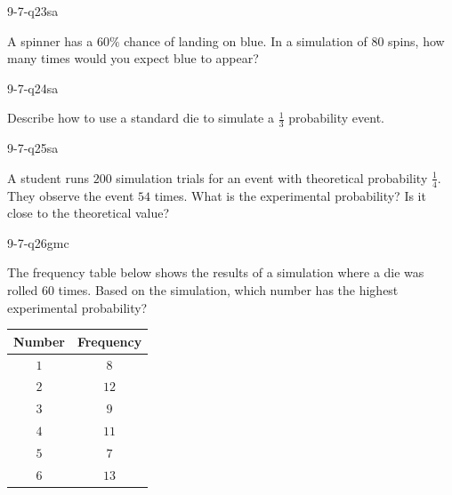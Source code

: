 \begin{practiceQuestion}{9-7-q23}{sa}
\begin{questionText}
A spinner has a $60\%$ chance of landing on blue. In a simulation of $80$ spins, how many times would you expect blue to appear?
\end{questionText}
\end{practiceQuestion}

\begin{practiceQuestion}{9-7-q24}{sa}
\begin{questionText}
Describe how to use a standard die to simulate a $\frac{1}{3}$ probability event.
\end{questionText}
\end{practiceQuestion}

\begin{practiceQuestion}{9-7-q25}{sa}
\begin{questionText}
A student runs $200$ simulation trials for an event with theoretical probability $\frac{1}{4}$. They observe the event $54$ times. What is the experimental probability? Is it close to the theoretical value?
\end{questionText}
\end{practiceQuestion}


\begin{practiceQuestion}{9-7-q26}{gmc}
\begin{questionText}
The frequency table below shows the results of a simulation where a die was rolled $60$ times. Based on the simulation, which number has the highest experimental probability?

\begin{center}
\begin{tabular}{|c|c|}
\hline
\textbf{Number} & \textbf{Frequency} \\
\hline
$1$ & $8$ \\
\hline
$2$ & $12$ \\
\hline
$3$ & $9$ \\
\hline
$4$ & $11$ \\
\hline
$5$ & $7$ \\
\hline
$6$ & $13$ \\
\hline
\end{tabular}
\end{center}
\end{questionText}
\end{practiceQuestion}

